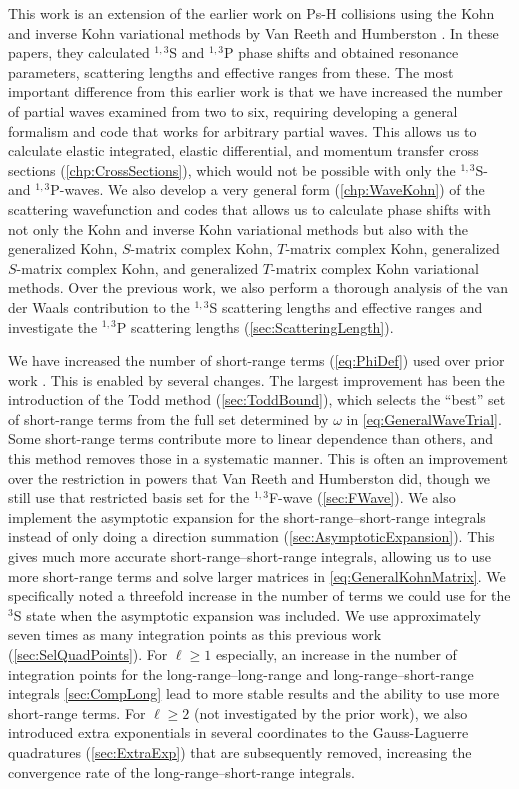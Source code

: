 \documentclass[Dissertation.tex]{subfiles}
\begin{document}
This work is an extension of the earlier work on Ps-H collisions using the 
Kohn and inverse Kohn variational methods by Van Reeth and Humberston
\cite{VanReeth2003,VanReeth2004}. In these papers, they calculated $^{1,3}$S
and $^{1,3}$P phase shifts and obtained resonance parameters, scattering lengths
and effective ranges from these. The most important difference from this earlier 
work is that we have increased the number of partial waves examined from two 
to six, requiring developing a general formalism and code that works for 
arbitrary partial waves. This allows us to calculate elastic integrated, elastic
differential, and momentum transfer cross sections (\cref{chp:CrossSections}),
which would not be possible with only the
$^{1,3}$S- and $^{1,3}$P-waves. We also develop a very general form
(\cref{chp:WaveKohn}) of the scattering wavefunction and codes that allows us to
calculate phase shifts with not only the Kohn and inverse Kohn variational methods
but also with the generalized Kohn, $S$-matrix complex Kohn, $T$-matrix complex
Kohn, generalized $S$-matrix complex Kohn, and generalized $T$-matrix complex
Kohn variational methods. Over the previous work, we also perform a thorough
analysis of the van der Waals contribution to the $^{1,3}$S scattering lengths
and effective ranges and investigate the $^{1,3}$P scattering lengths
(\cref{sec:ScatteringLength}).

We have increased the number of short-range terms (\cref{eq:PhiDef}) used 
over prior work \cite{VanReeth2003,VanReeth2004}. This is enabled by several
changes. The largest improvement has been the introduction of the Todd method
(\cref{sec:ToddBound}), which selects the ``best'' set of short-range terms
from the full set determined by $\omega$ in \cref{eq:GeneralWaveTrial}. Some
short-range terms contribute more to linear dependence than others, and this
method removes those in a systematic manner. This is often an improvement 
over the restriction in powers that Van Reeth and Humberston
\cite{VanReeth2003} did, though we still use that restricted basis set for
the $^{1,3}$F-wave (\cref{sec:FWave}). We also implement the asymptotic
expansion \cite{Drake1995,Yan1997} for the short-range--short-range integrals
instead of only doing a direction summation (\cref{sec:AsymptoticExpansion}).
This gives much more accurate short-range--short-range integrals, allowing us
to use more short-range terms and solve larger matrices in
\cref{eq:GeneralKohnMatrix}. We specifically noted a threefold increase in the
number of terms we could use for the $^3$S state when the asymptotic expansion
was included. We use approximately seven times as many
integration points as this previous work (\cref{sec:SelQuadPoints}).
For $\ell \geq 1$ especially, an increase in the number of
integration points for the long-range--long-range and long-range--short-range
integrals \cref{sec:CompLong} lead to more stable results and the ability to
use more short-range terms. For $\ell \geq 2$ (not investigated by the prior
work), we also introduced extra exponentials in several coordinates to the
Gauss-Laguerre quadratures (\cref{sec:ExtraExp}) that are subsequently removed,
increasing the convergence rate of the long-range--short-range integrals.
\end{document}
